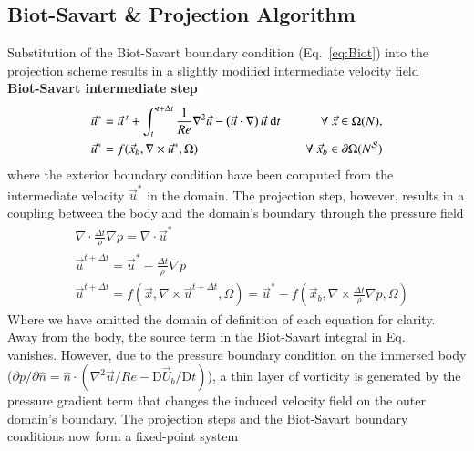 \documentclass[preprint,12pt]{elsarticle}
\begin{document}
\subsection{Biot-Savart \& Projection Algorithm}\label{sec:Biot_projection}
Substitution of the Biot-Savart boundary condition (Eq.~\ref{eq:Biot}) into the projection scheme results in a slightly modified intermediate velocity field\\
\textbf{Biot-Savart intermediate step}
\begin{align}
    &\vec{u}^* = \vec{u}\,^t + \int_{t}^{t+\Delta t}\frac{1}{Re}\nabla^2\vec{u} -\left(\vec{u}\cdot\nabla\right)\vec{u}\text{ d}t &\quad\forall\ \vec{x}\in\Omega (N),\\
    &\vec{u}^* = f(\vec{x}_b,\nabla\times \vec{u}^*,\Omega) &\quad\forall\ \vec{x}_b\in\partial\Omega (N^{\cal S})
\end{align}
where the exterior boundary condition have been computed from the intermediate velocity $\vec{u}^*$ in the domain. The projection step, however, results in a coupling between the body and the domain's boundary through the pressure field
\begin{align}
  &\nabla\cdot\frac{\Delta t}{\rho}\nabla p = \nabla\cdot \vec{u}^* \\
  &\vec{u}^{t+\Delta t} = \vec{u}^*-\frac{\Delta t}{\rho}\nabla p \\
  &\vec{u}^{t+\Delta t} = f(\vec{x},\nabla\times \vec{u}^{t+\Delta t},\Omega)= \vec{u}^*-f(\vec{x}_b,\nabla\times\frac{\Delta t}{\rho}\nabla p,\Omega) 
\end{align}
Where we have omitted the domain of definition of each equation for clarity. Away from the body, the source term in the Biot-Savart integral in Eq.~\theequation~ vanishes. However, due to the pressure boundary condition on the immersed body ($\partial p/\partial\hat{n}=\hat{n}\cdot(\nabla^2\vec{u}/Re-\text{D}\vec{U}_b/\text{D}t)$), a thin layer of vorticity is generated by the pressure gradient term that changes the induced velocity field on the outer domain's boundary. The projection steps and the Biot-Savart boundary conditions now form a fixed-point system
\end{document}
